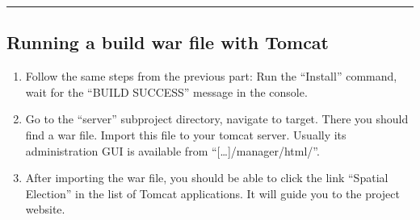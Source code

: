 \begin{center}\rule{3in}{0.4pt}\end{center}


\subsection{Running a build war file with
Tomcat}\label{running-a-build-war-file-with-tomcat}

\begin{enumerate}
\def\labelenumi{\arabic{enumi}.}
\itemsep1pt\parskip0pt
\item
  Follow the same steps from the previous part: Run the ``Install''
  command, wait for the ``BUILD SUCCESS'' message in the console.
\item
  Go to the ``server'' subproject directory, navigate to target. There
  you should find a war file. Import this file to your tomcat server.
  Usually its administration GUI is available from
  ``{[}\ldots{}{]}/manager/html/''.
\item
  After importing the war file, you should be able to click the link
  ``Spatial Election'' in the list of Tomcat applications. It will guide
  you to the project website.
\end{enumerate}